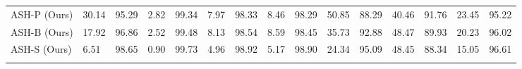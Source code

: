 \documentclass{article}
\newcommand{\tablabel}[1]{\label{tab:#1}}
\begin{document}
\begin{sidewaystable}
{\begin{tabular}{lllllllllllllll}
 \rowcolor{lightgray}ASH-P (Ours) & 30.14 & 95.29 & 2.82 & 99.34 & 7.97 & 98.33 & 8.46 & 98.29 & 50.85 & 88.29 & 40.46 & 91.76 & 23.45 & 95.22\\
\rowcolor{lightgray}ASH-B (Ours) & 17.92 & 96.86 & 2.52 & 99.48 & 8.13 & 98.54 & 8.59 & 98.45 & 35.73 & 92.88 & 48.47 & 89.93 & 20.23 & 96.02 \\
\rowcolor{lightgray}ASH-S (Ours) & 6.51 & 98.65 & 0.90 & 99.73 & 4.96 & 98.92 & 5.17 & 98.90 & 24.34 & 95.09 & 48.45 & 88.34 & 15.05 & 96.61 \\
\\ \bottomrule
\end{tabular}}
\tablabel{detailresultscifar10}
\end{sidewaystable}

\begin{sidewaystable}
\caption{\small Detailed results on six common OOD benchmark datasets: Textures~\citep{cimpoi2014describing}, SVHN~\citep{netzer2011reading}, Places365~\citep{zhou2017places}, LSUN-Crop~\citep{yu2015lsun}, LSUN-Resize~\citep{yu2015lsun}, and iSUN~\citep{xu2015turkergaze}. For each ID dataset, we use the same DenseNet pretrained on \textbf{CIFAR-100}.  indicates larger values are better and  indicates smaller values are better. }
\end{sidewaystable}
\end{document}

